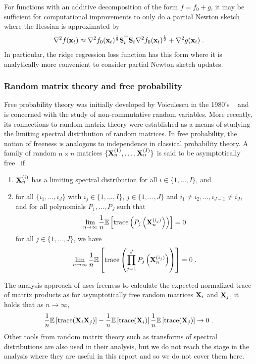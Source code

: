 For functions with an additive decomposition of the form $f=f_0+g$, it may be sufficient for computational improvements to only do a partial Newton sketch~\citep{Pilanci:2017} where the Hessian is approximated by
\[
\nabla^2f(\mathbf{x}_t) \approx \nabla^2f_0(\mathbf{x}_t)^\frac{1}{2}\mathbf{S}_t^\top\mathbf{S}_t\nabla^2f_0(\mathbf{x}_t)^\frac{1}{2} + \nabla^2g(\mathbf{x}_t) \;.
\]
In particular, the ridge regression loss function has this form where it is analytically more convenient to consider partial Newton sketch updates.

\subsubsection{Random matrix theory and free probability} \label{sec:freeprob}

Free probability theory was initially developed by Voiculescu in the 1980's ~\citep{Anderson:2009} and is concerned with the study of non-commutative random variables. More recently, its connections to random matrix theory were established as a means of studying the limiting spectral distribution of random matrices. In free probability, the notion of freeness is analogous to independence in classical probability theory. A family of random $n\times n$ matrices $\{\mathbf{X}_n^{(1)},\ldots,\mathbf{X}_n^{(I)}\}$ is said to be asymptotically free~\citep{Couillet:2011_free} if
\begin{enumerate}
\item
$\mathbf{X}_n^{(i)}$ has a limiting spectral distribution for all $i\in\{1,\ldots,I\}$, and
\item
for all $\{i_1,\ldots,i_J\}$ with $i_j\in\{1,\ldots,I\}$, $j\in\{1,\ldots,J\}$ and $i_1\neq i_2,\ldots,i_{J-1}\neq i_J$, and for all polynomials $P_1,\ldots,P_J$ such that
\[
\lim_{n\rightarrow\infty} \frac{1}{n}\mathbb{E}\left[\mathrm{trace}\left(P_j\left(\mathbf{X}_n^{(i_j)}\right)\right)\right] = 0
\]
for all $j\in\{1,\ldots,J\}$, we have
\[
\lim_{n\rightarrow\infty} \frac{1}{n}\mathbb{E}\left[\mathrm{trace}\left(\prod_{j=1}^JP_j\left(\mathbf{X}_n^{(i_j)}\right)\right)\right] = 0 \;.
\]
\end{enumerate}
The analysis approach of \citet{Lacotte:2020} uses freeness to calculate the expected normalized trace of matrix products as for asymptotically free random matrices $\mathbf{X}_i$ and $\mathbf{X}_j$, it holds that as $n\rightarrow\infty$,
\[
\frac{1}{n}\mathbb{E}\left[\mathrm{trace}(\mathbf{X}_i\mathbf{X}_j)\right] - \frac{1}{n}\mathbb{E}\left[\mathrm{trace}(\mathbf{X}_i)\right]\frac{1}{n}\mathbb{E}\left[\mathrm{trace}(\mathbf{X}_j)\right] \rightarrow 0 \;.
\]
Other tools from random matrix theory such as transforms of spectral distributions are also used in their analysis, but we do not reach the stage in the analysis where they are useful in this report and so we do not cover them here.


